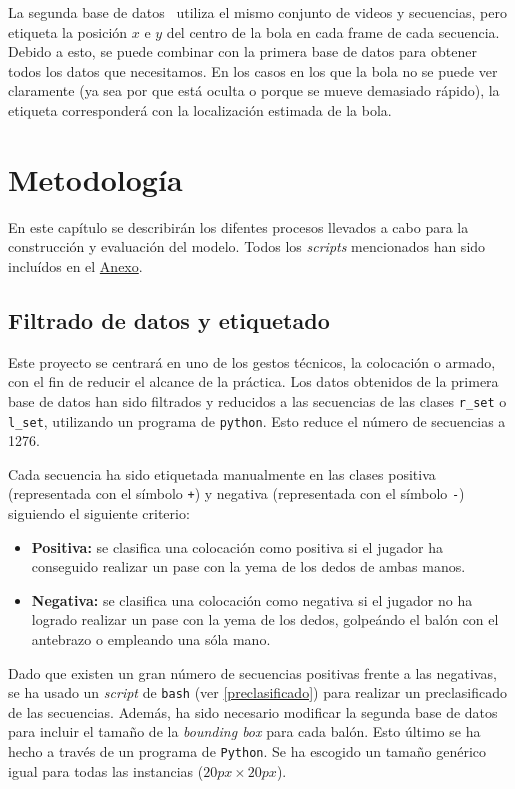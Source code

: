 \documentclass[12pt]{report} %
\begin{document}
    La segunda base de datos~\cite{dataset2} utiliza el mismo conjunto de videos y secuencias,
    pero etiqueta la posición $x$ e $y$ del centro de la bola en cada frame de
    cada secuencia. Debido a esto, se puede combinar con la primera base de
    datos para obtener todos los datos que necesitamos. En los casos en los que
    la bola no se puede ver claramente (ya sea por que está oculta o porque se
    mueve demasiado rápido), la etiqueta corresponderá con la localización
    estimada de la bola.

    \chapter{Metodología}
    \label{chap:metodologia}
    En este capítulo se describirán los difentes procesos llevados a cabo para la construcción y evaluación del modelo. Todos los \textit{scripts} mencionados han sido incluídos en el \hyperref[anexo]{Anexo}.

    \section{Filtrado de datos y etiquetado}

    Este proyecto se centrará en uno de los gestos técnicos, la colocación o
    armado, con el fin de reducir el alcance de la práctica. Los datos obtenidos
    de la primera base de datos han sido filtrados y reducidos a las secuencias
    de las clases \verb!r_set! o \verb!l_set!, utilizando un programa de
    \verb!python!. Esto reduce el número de
    secuencias a 1276.

    Cada secuencia ha sido etiquetada manualmente en las clases positiva
    (representada con el símbolo \verb!+!) y negativa (representada con el
    símbolo \verb!-!) siguiendo el siguiente criterio:
    \begin{itemize}
        \item \textbf{Positiva:} se clasifica una colocación como positiva si
        el jugador ha conseguido realizar un pase con la yema de los dedos de
        ambas manos.
        \item \textbf{Negativa:} se clasifica una colocación como negativa si
        el jugador no ha logrado realizar un pase con la yema de los dedos,
        golpeándo el balón con el antebrazo o empleando una sóla mano.
    \end{itemize}
    
    Dado que existen un gran número de secuencias positivas frente a las
    negativas, se ha usado un \textit{script} de \texttt{bash} (ver
    \ref{preclasificado}) para realizar un preclasificado de las secuencias.
    Además, ha sido necesario modificar la segunda base de datos para incluir
    el tamaño de la \textit{bounding box} para cada balón. Esto último se ha
    hecho a través de un programa de \texttt{Python}. Se ha escogido un 
    tamaño genérico igual para todas las instancias ($20px\times20px$).
\end{document}
